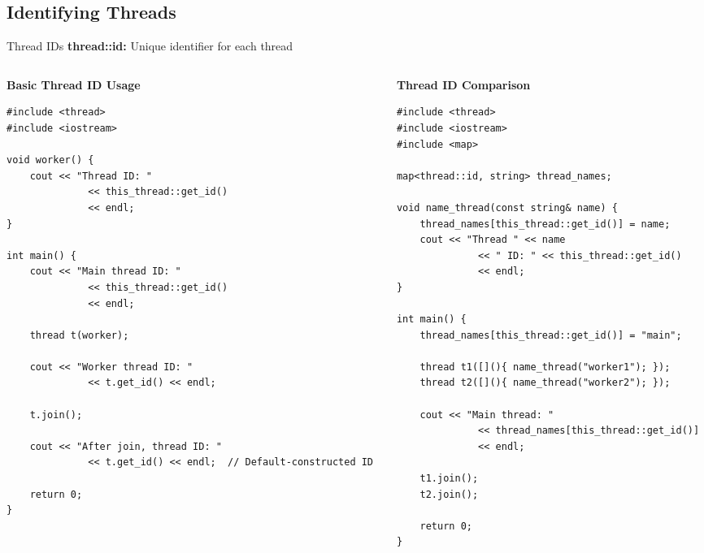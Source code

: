 \subsection{Identifying Threads}

\begin{frame}[fragile]{Thread IDs}
	\textbf{thread::id:} Unique identifier for each thread

	\begin{columns}
		\begin{column}{0.5\textwidth}
			\textbf{Basic Thread ID Usage}
			\begin{verbatim}
#include <thread>
#include <iostream>

void worker() {
    cout << "Thread ID: "
              << this_thread::get_id()
              << endl;
}

int main() {
    cout << "Main thread ID: "
              << this_thread::get_id()
              << endl;

    thread t(worker);

    cout << "Worker thread ID: "
              << t.get_id() << endl;

    t.join();

    cout << "After join, thread ID: "
              << t.get_id() << endl;  // Default-constructed ID

    return 0;
}
			\end{verbatim}
		\end{column}
		\begin{column}{0.5\textwidth}
			\textbf{Thread ID Comparison}
			\begin{verbatim}
#include <thread>
#include <iostream>
#include <map>

map<thread::id, string> thread_names;

void name_thread(const string& name) {
    thread_names[this_thread::get_id()] = name;
    cout << "Thread " << name
              << " ID: " << this_thread::get_id()
              << endl;
}

int main() {
    thread_names[this_thread::get_id()] = "main";

    thread t1([](){ name_thread("worker1"); });
    thread t2([](){ name_thread("worker2"); });

    cout << "Main thread: "
              << thread_names[this_thread::get_id()]
              << endl;

    t1.join();
    t2.join();

    return 0;
}
			\end{verbatim}
		\end{column}
	\end{columns}
\end{frame}

